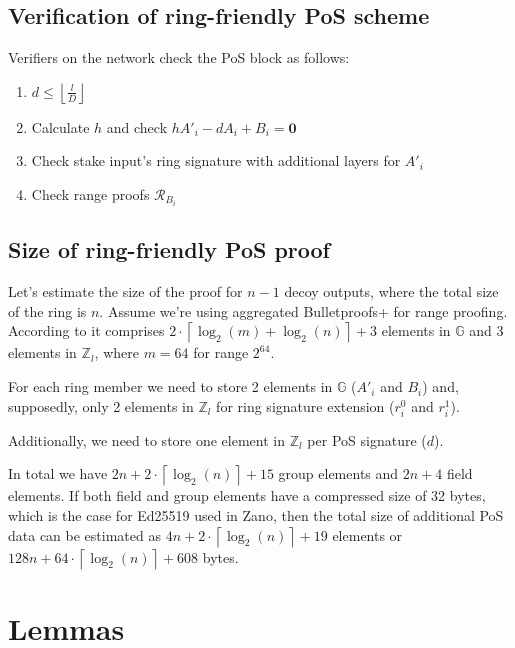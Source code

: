 \documentclass{article}
\newcommand{\floor}[1]{\left\lfloor #1 \right\rfloor}
\newcommand{\ceil}[1]{\left\lceil #1 \right\rceil}
\numberwithin{figure}{section}
\begin{document}
\subsection{Verification of ring-friendly PoS scheme}
Verifiers on the network check the PoS block as follows:

\begin{enumerate}
    \item $d \leq \floor{\frac{l}{D}}$
    
    \item Calculate $h$ and check $h A'_i - d A_i + B_i = \mathbf{0}$
    
    \item Check stake input's ring signature with additional layers for $A'_i$
    
    \item Check range proofs $\mathcal{R}_B_i$
\end{enumerate}


\subsection{Size of ring-friendly PoS proof}

Let's estimate the size of the proof for $n-1$ decoy outputs, where the total size of the ring is $n$. Assume we're using aggregated Bulletproofs+ for range proofing. According to \cite{BP+} it comprises $2 \cdot \ceil{\log_2(m) + \log_2(n)} + 3$ elements in $\mathbb{G}$ and 3 elements in $\mathbb{Z}_l$, where $m = 64$ for range $2^{64}$.

For each ring member we need to store 2 elements in $\mathbb{G}$ ($A'_i$ and $B_i$) and, supposedly, only 2 elements in $\mathbb{Z}_l$ for ring signature extension ($r^0_i$ and $r^1_i$).

Additionally, we need to store one element in $\mathbb{Z}_l$ per PoS signature ($d$).

In total we have $2n + 2 \cdot \ceil{\log_2(n)} + 15$ group elements and $2n + 4$ field elements. If both field and group elements have a compressed size of 32 bytes, which is the case for Ed25519 used in Zano, then the total size of additional PoS data can be estimated as $4n + 2 \cdot \ceil{\log_2(n)} + 19$ elements or $128n + 64 \cdot \ceil{\log_2(n)} + 608$ bytes.

%
%
\printbibliography


\newpage
\appendix
\section{Lemmas}
\end{document}
